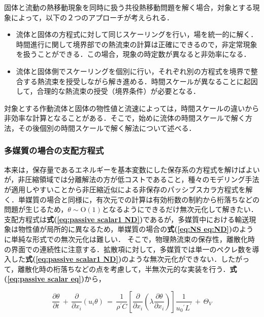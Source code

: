 固体と流動の熱移動現象を同時に扱う共役熱移動問題を解く場合，対象とする現象によって，以下の２つのアプローチが考えられる．

\begin{itemize}
\item 流体と固体の方程式に対して同じスケーリングを行い，場を統一的に解く．時間進行に関して境界部での熱流束の計算は正確にできるので，非定常現象を扱うことができる．この場合，現象の時定数が異なると非効率になる．
\item 流体と固体側でスケーリングを個別に行い，それぞれ別の方程式を境界で整合する熱流束を授受しながら解き進める．時間スケールが異なることに起因して，合理的な熱流束の授受（境界条件）が必要となる．
\end{itemize}

対象とする作動流体と固体の物性値と流速によっては，時間スケールの違いから非効率な計算となることがある．そこで，始めに流体の時間スケールで解く方法，その後個別の時間スケールで解く解法について述べる．

%
\subsubsection{多媒質の場合の支配方程式}
本来は，保存量であるエネルギーを基本変数にした保存系の方程式を解けばよいが，非圧縮領域では分離解法の方が低コストであること，種々のモデリング手法が適用しやすいことから非圧縮近似による非保存のパッシブスカラ方程式を解く．単媒質の場合と同様に，有次元での計算は有効桁数の制約から桁落ちなどの問題が生じるため，$\theta \sim \mathrm{O}(1)$となるようにできるだけ無次元化して解きたい．
支配方程式は\textbf{式(\ref{eq:passive scalar1 ND})}であるが，多媒質中における輸送現象は物性値が局所的に異なるため，単媒質の場合の\textbf{式(\ref{eq:NS eq:ND})}のように単純な形式での無次元化は難しい．
そこで，物理熱流束の保存性，離散化時の界面での連続性に注意する．拡散項に対して，多媒質では単一のペクレ数を導入した\textbf{式(\ref{eq:passive scalar1 ND})}のような無次元化ができない．したがって，離散化時の桁落ちなどの点を考慮して，半無次元的な実装を行う．\textbf{式(\ref{eq:passive scalar eq})}から，

\begin{equation}
\frac{\partial \theta}{\partial t} \,+\, \frac{\partial}{\partial {x_{i}}} \left({ {{u}_{i}} \theta }\right)
\, =\,
\frac{1}{\rho^{\prime}C} \left[{ \frac{\partial}{\partial{x_{i}}} \left({ \lambda \frac{\partial\theta}{\partial{x_{i}}} }\right) }\right] \frac{1}{{u_{\mathit{0}}}^{\prime} L^{\prime}} \,+\, \Theta_{V}
\label{eq:mm scalar ND}
\end{equation}

